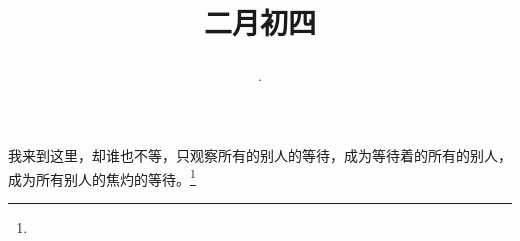 \title{\date[d=13,m=3,y=2024][year:cn-y,年,month:cn,day:cn,日,·,weekday]·二月初四 }
我来到这里，却谁也不等，只观察所有的别人的等待，成为等待着的所有的别人，成为所有别人的焦灼的等待。\footnote{ }

